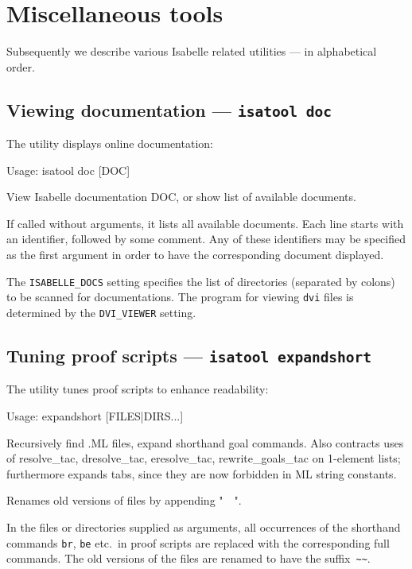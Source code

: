 

\chapter{Miscellaneous tools} \label{ch:tools}

Subsequently we describe various Isabelle related utilities --- in
alphabetical order.


\section{Viewing documentation --- \texttt{isatool doc}} \label{sec:tool-doc}

The  utility displays online documentation:
\begin{ttbox}
Usage: isatool doc [DOC]

  View Isabelle documentation DOC, or show list of available documents.
\end{ttbox}
If called without arguments, it lists all available documents. Each
line starts with an identifier, followed by some comment. Any of these
identifiers may be specified as the first argument in order to have
the corresponding document displayed.

\medskip The \texttt{ISABELLE_DOCS} setting specifies the list of
directories (separated by colons) to be scanned for documentations.
The program for viewing \texttt{dvi} files is determined by the
\texttt{DVI_VIEWER} setting.


\section{Tuning proof scripts --- \texttt{isatool expandshort}}

The  utility tunes {\ML} proof scripts to enhance
readability:
\begin{ttbox}
Usage: expandshort [FILES|DIRS...]

  Recursively find .ML files, expand shorthand goal commands.
  Also contracts uses of resolve_tac, dresolve_tac, eresolve_tac,
  rewrite_goals_tac on 1-element lists; furthermore expands tabs,
  since they are now forbidden in ML string constants.

  Renames old versions of files by appending "~~".
\end{ttbox}
In the files or directories supplied as arguments, all occurrences of
the shorthand commands \texttt{br}, \texttt{be} etc.\ in proof scripts
are replaced with the corresponding full commands.  The old versions
of the files are renamed to have the suffix~\verb'~~'.


